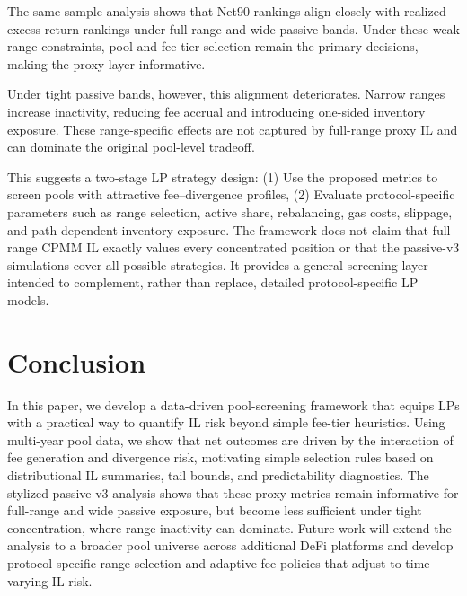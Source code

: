 \documentclass[10pt,conference,compsocconf]{IEEEtran}
\begin{document}
The same-sample analysis shows that Net90 rankings align closely with realized excess-return rankings under full-range and wide passive bands. Under these weak range constraints, pool and fee-tier selection remain the primary decisions, making the proxy layer informative.

Under tight passive bands, however, this alignment deteriorates. Narrow ranges increase inactivity, reducing fee accrual and introducing one-sided inventory exposure. These range-specific effects are not captured by full-range proxy IL and can dominate the original pool-level tradeoff.

This suggests a two-stage LP strategy design: (1) Use the proposed metrics to screen pools with attractive fee--divergence profiles,  (2) Evaluate protocol-specific parameters such as range selection, active share, rebalancing, gas costs, slippage, and path-dependent inventory exposure. The framework does not claim that full-range CPMM IL exactly values every concentrated position or that the passive-v3 simulations cover all possible strategies. It provides a general screening layer intended to complement, rather than replace, detailed protocol-specific LP models.

\section{Conclusion}
\label{sec:conclusion}
In this paper, we develop a data-driven pool-screening framework that equips LPs with a practical way to quantify IL risk beyond simple fee-tier heuristics.
Using multi-year pool data, we show that net outcomes are driven by the interaction of fee generation and divergence risk, motivating simple selection rules based on distributional IL summaries, tail bounds, and predictability diagnostics. 
The stylized passive-v3 analysis shows that these proxy metrics remain informative for full-range and wide passive exposure, but become less sufficient under tight concentration, where range inactivity can dominate.
Future work will extend the analysis to a broader pool universe across additional DeFi platforms and develop protocol-specific range-selection and adaptive fee policies that adjust to time-varying IL risk.





\end{document}
